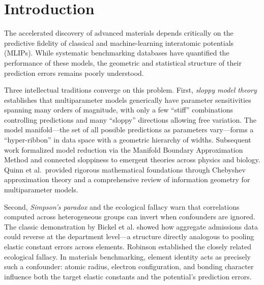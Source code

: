 \documentclass[twocolumn,9pt]{extarticle}
\begin{document}
\maketitle
\thispagestyle{fancy}



\section{Introduction}

The accelerated discovery of advanced materials depends critically on the predictive fidelity of classical and machine-learning interatomic potentials (MLIPs)\cite{frederiksen2004,mortensen2005}. While systematic benchmarking databases have quantified the performance of these models\cite{kurniawan2022,openkim}, the geometric and statistical structure of their prediction errors remains poorly understood.

Three intellectual traditions converge on this problem. First, \textit{sloppy model theory} establishes that multiparameter models generically have parameter sensitivities spanning many orders of magnitude, with only a few ``stiff'' combinations controlling predictions and many ``sloppy'' directions allowing free variation\cite{brown2003,waterfall2006,gutenkunst2007}. The model manifold---the set of all possible predictions as parameters vary---forms a ``hyper-ribbon'' in data space with a geometric hierarchy of widths\cite{transtrum2010,transtrum2011,machta2013}. Subsequent work formalized model reduction via the Manifold Boundary Approximation Method\cite{transtrum2014} and connected sloppiness to emergent theories across physics and biology\cite{transtrum2015}. Quinn et al.\ provided rigorous mathematical foundations through Chebyshev approximation theory\cite{quinn2019} and a comprehensive review of information geometry for multiparameter models\cite{quinn2023}.

Second, \textit{Simpson's paradox} and the ecological fallacy warn that correlations computed across heterogeneous groups can invert when confounders are ignored\cite{simpson1951,blyth1972,pearl2014}. The classic demonstration by Bickel et al.\cite{bickel1975} showed how aggregate admissions data could reverse at the department level---a structure directly analogous to pooling elastic constant errors across elements. Robinson\cite{robinson1950} established the closely related ecological fallacy. In materials benchmarking, element identity acts as precisely such a confounder: atomic radius, electron configuration, and bonding character influence both the target elastic constants and the potential's prediction errors\cite{pearl2009}.
\end{document}
